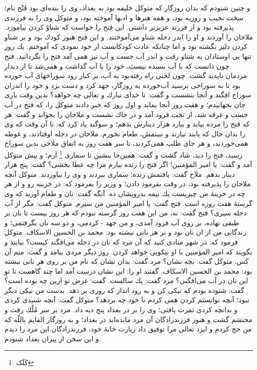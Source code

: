 و چنين شنودم كه بدان روزگار كه متوكل خليفه بود به بغداد، وى را بنده‌اى بود فَتْح نام؛ سخت نجيب و روزبه بود، و همه هنرها و ادبها آموخته بود، و متوكل وى را به فرزندى پذيرفته بود و از فرزند عزيزتر داشتى. اين فتح را خواست كه شناوْ كردن بياموزد. ملاحان را آوردند و او را اندر دجله شناو مى‌آموختند. و اين فتح هنوز كودك بود و بر شناو كردن دلير نگشته بود و اما چنانكه عادت كودكانست از خود نمودى كه آموختم. يك روز تنها بى‌ اوستادان به شناو رفت و اندر آب جست و آب تيز همى آمد فتح را بگردانيد. فتح چون دانست كه با آب بسنده نيستَ، خود را با آب گذاشت و همى‌شد تا از ديدار مردمان ناپديد گشت. چون لختى راه رفته‌بود به آب، بر كنار رود سوراخهاى آب خورده بود تا به سوراخى برسيد آب‌خورده به روزگار، جهد كرد و دست بزد و خود را اندران سوراخ افگند و آنجا بنشست و گفت: تا خداى تبارك و تعالى چه خواهد؟ بدين وقت بارى جان بجهانيدم؛ و هفت روز آنجا بماند و اول روز كه خبر دادند متوكل را، كه فتح در آب جست و غرقه شد، از تخت فرود آمد و در خاك نشست و ملاحان را بخواند و گفت: هر كه فتح را مرده بيابد و بيارد هزار دينارش بدهم؛ و سوگند ياد كرد كه: تا آن وقت كه وى را بدان حال كه يابند نيارند و نبينمش، طعام نخورم. ملاحان در دجله اوفتادند، و غوطه همى‌خوردند، و هر جاى طلب همى‌كردند، تا سر هفت روز به اتفاق ملاحى بدين سوراخ رسيد، فتح را ديد، شاد گشت و گفت: همين‌جا بنشين تا سمارى \footnote{کَلَک} آرم؛ و پيش متوكل آمد و گفت: يا امير المؤمنين! اگر فتح را زنده بيارم مرا چه عطا بخشى‌؟ گفت: پنج هزار دينار بدهم. ملاح گفت: يافتمش زنده؛ سمارى ببردند و وى را بياوردند. متوكل آنچه ملاحان را پذيرفته بود، در وقت بفرمود دادن؛ و وزير را بفرمود كه: در خزينه رو و از هر چه در خزينۀ من چيزيست يك نيمه بدرويشان ده. آنگه گفت: نان و طعام آوريد كه وى گرسنۀ هفت روزه است. فتح گفت: يا امير المؤمنين من سيرم. متوكل گفت: مگر از آب دجله سيرى‌؟ فتح گفت: نه، من اين هفت روز گرسنه نبودم كه هر روز بيست تا نان بر طبقى نهاده، بر روى آب فرود آمدى، و من جهد - كردمى، و دو سه نان بگرفتمى؛ و زندگانى من از ان نان بود و بر هر نانى نبشته بود: محمد بن الحسين الاسكاف. متوكل فرمود كه: در شهر منادى كنيد كه آن مرد كه نان در دجله مى‌افگند كيست‌؟ بيايند و بگويند كه امير المؤمنين با او نيكويى خواهد كردن. روز ديگر مردى بيامد و گفت: منم آن‌ كس. متوكل گفت: بچه نشان‌؟ مرد گفت: بدان نشان كه نام من بر روى هر نانى نبشته بود: محمد بن الحسين الاسكاف. گفتند او را: اين نشان درست آمد اما چند گاهست تا تو اين نان در آب مى‌افگنى‌؟ مرد گفت: يك سالست. گفت: غرض تو ازين چه بوده است‌؟ گفت: شنوده بودم كه نيكى كن و به رود انداز كه روزى بر دهد. بدست من نيكى ديگر نبود؛ آنچه توانستم كردن همى كردم تا خود چه بردهد؟ متوكل گفت: آنچه شنيدى كردى و بدانچه كردى ثمرت يافتى؛ وى را بر در بغداد پنج ديه داد. مرد بر سر مُلْك رفت و محتشم گشت و هنوز فرزندزادگان آن مرد مانده‌اند در بغداد؛ و به روزگار القايم باللّه كه من حج كردم و ايزد تعالى مرا توفيق داد زيارت خانۀ خود، فرزندزادگان اين مرد را ديدم و اين سخن از پيران بغداد شنودم.


